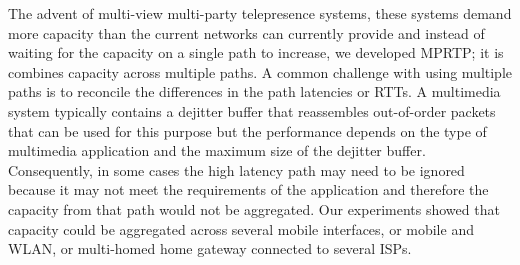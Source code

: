 The advent of multi-view multi-party telepresence systems, these systems
demand more capacity than the current networks can currently provide and
instead of waiting for the capacity on a single path to increase, we developed
MPRTP; it is combines capacity across multiple paths. A common challenge with
using multiple paths is to reconcile the differences in the path latencies or
RTTs. A multimedia system typically contains a dejitter buffer that
reassembles out-of-order packets that can be used for this purpose but the
performance depends on the type of multimedia application and the maximum size
of the dejitter buffer. Consequently, in some cases the high latency path may
need to be ignored because it may not meet the requirements of the application
and therefore the capacity from that path would not be aggregated. Our
experiments showed that capacity could be aggregated across several mobile
interfaces, or mobile and WLAN, or multi-homed home gateway connected to
several ISPs.





